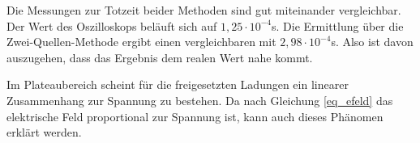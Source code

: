 Die Messungen zur Totzeit beider Methoden sind gut miteinander vergleichbar. Der Wert des Oszilloskops beläuft sich auf
$1,25 \cdot 10^{-4}$s. Die Ermittlung über die Zwei-Quellen-Methode ergibt einen vergleichbaren mit $2,98 \cdot 10^{-4}$s. Also ist
davon auszugehen, dass das Ergebnis dem realen Wert nahe kommt.

Im Plateaubereich scheint für die freigesetzten Ladungen ein linearer Zusammenhang zur Spannung zu bestehen. Da nach Gleichung \eqref{eq_efeld}
das elektrische Feld proportional zur Spannung ist, kann auch dieses Phänomen erklärt werden.



